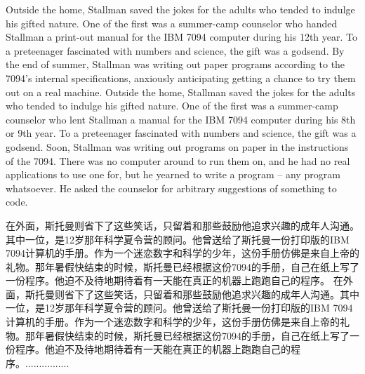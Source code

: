 \ifdefined\eng
\ifdefined\vone
Outside the home, Stallman saved the jokes for the adults who tended to indulge his gifted nature. One of the first was a summer-camp counselor who handed Stallman a print-out manual for the IBM 7094 computer during his 12th year. To a preteenager fascinated with numbers and science, the gift was a godsend. By the end of summer, Stallman was writing out paper programs according to the 7094's internal specifications, anxiously anticipating getting a chance to try them out on a real machine.
\fi
\ifdefined\vtwo
Outside the home, Stallman saved the jokes for the adults who tended to indulge his gifted nature. One of the first was a summer-camp counselor who lent Stallman a manual for the IBM 7094 computer during his 8th or 9th year. To a preteenager fascinated with numbers and science, the gift was a godsend. Soon, Stallman was writing out programs on paper in the instructions of the 7094.  There was no computer around to run them on, and he had no real applications to use one for, but he yearned to write a program -- any program whatsoever.  He asked the counselor for arbitrary suggestions of something to code.
\fi
\fi

\ifdefined\chs
\ifdefined\vone
在外面，斯托曼则省下了这些笑话，只留着和那些鼓励他追求兴趣的成年人沟通。其中一位，是12岁那年科学夏令营的顾问。他曾送给了斯托曼一份打印版的IBM 7094计算机的手册。作为一个迷恋数字和科学的少年，这份手册仿佛是来自上帝的礼物。那年暑假快结束的时候，斯托曼已经根据这份7094的手册，自己在纸上写了一份程序。他迫不及待地期待着有一天能在真正的机器上跑跑自己的程序。
\fi
\ifdefined\vtwo
在外面，斯托曼则省下了这些笑话，只留着和那些鼓励他追求兴趣的成年人沟通。其中一位，是12岁那年科学夏令营的顾问。他曾送给了斯托曼一份打印版的IBM 7094计算机的手册。作为一个迷恋数字和科学的少年，这份手册仿佛是来自上帝的礼物。那年暑假快结束的时候，斯托曼已经根据这份7094的手册，自己在纸上写了一份程序。他迫不及待地期待着有一天能在真正的机器上跑跑自己的程序。................
\fi
\fi

